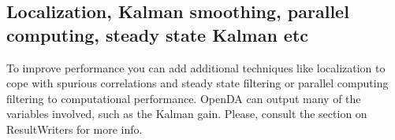 \documentclass[a4paper,10pt]{article}
\begin{document}
\subsection{Localization, Kalman smoothing, parallel computing, steady state Kalman etc}
To improve performance you can add additional techniques like localization to cope with spurious correlations and steady state filtering or parallel computing filtering to computational performance. OpenDA can output many of the variables involved, such as the Kalman gain. Please, consult the section on ResultWriters for more info.
\end{document}
